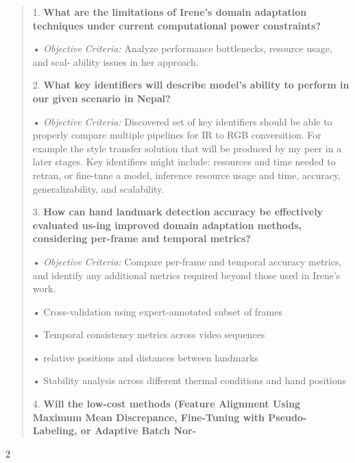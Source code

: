 \documentclass[
]{article}
\begin{document}
\begin{quote}
1. \textbf{What are the limitations of Irene's domain adaptation
techniques under current computational power constraints?}

• \emph{Objective Criteria:} Analyze performance bottlenecks, resource
usage, and scal- ability issues in her approach.

2. \textbf{What key identifiers will describe model's ability to perform
in our given scenario in Nepal?}

• \emph{Objective Criteria:} Discovered set of key identifiers should be
able to properly compare multiple pipelines for IR to RGB conversition.
For example the style transfer solution that will be produced by my peer
in a later stages. Key identifiers might include: resources and time
needed to retran, or fine-tune a model, inference resource usage and
time, accuracy, generalizability, and scalability.

3. \textbf{How can hand landmark detection accuracy be effectively
evaluated us-ing improved domain adaptation methods, considering
per-frame and temporal metrics?}

• \emph{Objective Criteria:} Compare per-frame and temporal accuracy
metrics, and identify any additional metrics required beyond those used
in Irene's work.

• Cross-validation using expert-annotated subset of frames

• Temporal consistency metrics across video sequences

• relative positions and distances between landmarks

• Stability analysis across different thermal conditions and hand
positions

4. \textbf{Will the low-cost methods (Feature Alignment Using Maximum
Mean Discrepance, Fine-Tuning with Pseudo-Labeling, or Adaptive Batch
Nor-}
\end{quote}

2
\end{document}
